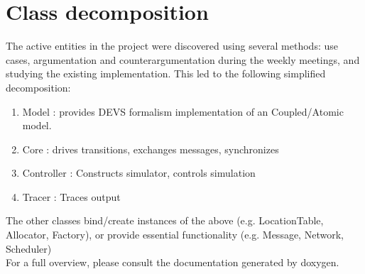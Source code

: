 \documentclass[8pt,a4paper]{report}
\begin{document}
\section{Class decomposition}
The active entities in the project were discovered using several methods: use cases, argumentation and counterargumentation during the weekly meetings, and studying the existing implementation. This led to the following simplified decomposition:
\begin{enumerate}
\item Model : provides DEVS formalism implementation of an Coupled/Atomic model.
\item Core : drives transitions, exchanges messages, synchronizes
\item Controller : Constructs simulator, controls simulation
\item Tracer : Traces output
\end{enumerate}
The other classes bind/create instances of the above (e.g. LocationTable, Allocator, Factory), or provide essential functionality (e.g. Message, Network, Scheduler)\\
For a full overview, please consult the documentation generated by doxygen.
\end{document}
